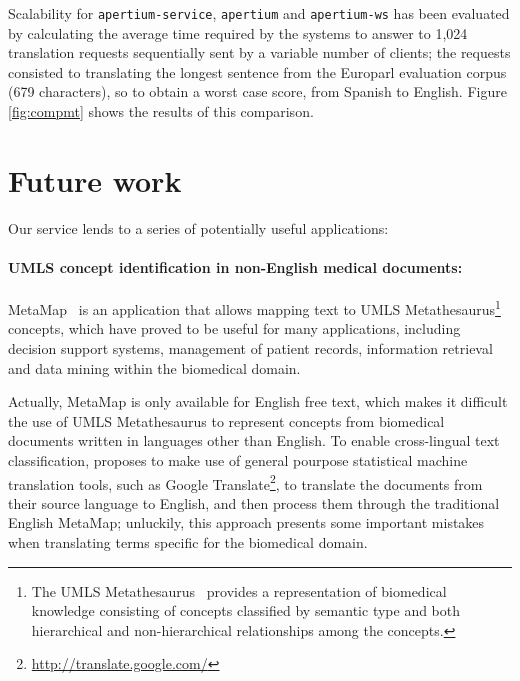 \documentclass[11pt]{article}
\begin{document}
Scalability for {\tt\small apertium-service}, {\tt\small apertium} and {\tt\small apertium-ws} has been evaluated by calculating the average time required by the systems to answer to 1,024 translation requests sequentially sent by a variable number of clients; the requests consisted to translating the longest sentence from the Europarl evaluation corpus (679 characters), so to obtain a worst case score, from Spanish to English. Figure \ref{fig:compmt} shows the results of this comparison.

\section{Future work} %

Our service lends to a series of potentially useful applications:

\paragraph{UMLS concept identification in non-English medical documents:} MetaMap~\citep{metamap} is an application that allows mapping text to UMLS Metathesaurus\footnote{The UMLS Metathesaurus~\citep{umls} provides a representation of biomedical knowledge consisting of concepts classified by semantic type and both hierarchical and non-hierarchical relationships among the concepts.} concepts, which have proved to be useful for many applications, including decision support systems, management of patient records, information retrieval and data mining within the biomedical domain.

Actually, MetaMap is only available for English free text, which makes it difficult the use of UMLS Metathesaurus to represent concepts from biomedical documents written in languages other than English. To enable cross-lingual text classification, \cite{metamapes} proposes to make use of general pourpose statistical machine translation tools, such as Google Translate\footnote{\small\url{http://translate.google.com/}}, to translate the documents from their source language to English, and then process them through the traditional English MetaMap; unluckily, this approach presents some important mistakes when translating terms specific for the biomedical domain.
\end{document}
